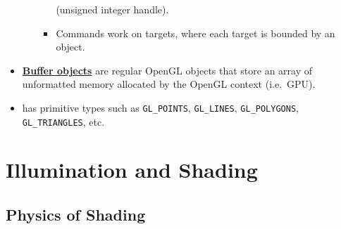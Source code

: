 \documentclass[twocolumn,landscape,10pt]{article}
\theoremstyle{definition}
\begin{document}
\begin{itemize}
\begin{itemize}
\begin{itemize}
                        (unsigned integer handle).
                    \item Commands work on targets, where each target is bounded
                        by an object.
                \end{itemize} 
        \end{itemize} 
    \item \underline{\textbf{Buffer objects}} are regular OpenGL objects that
        store an array of unformatted memory allocated by the OpenGL context
        (i.e.\ GPU).
    \item has primitive types such as \texttt{GL\_POINTS}, \texttt{GL\_LINES},
        \texttt{GL\_POLYGONS}, \texttt{GL\_TRIANGLES}, etc.
\end{itemize} 

\section{Illumination and Shading}

\subsection{Physics of Shading}
\end{document}
